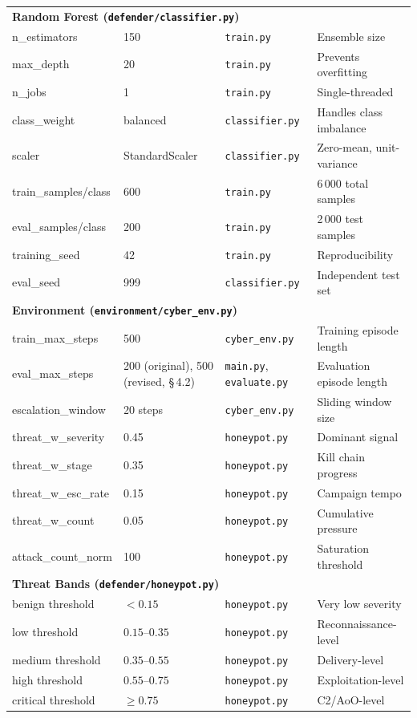 \begin{longtable}{p{3.8cm}p{2.6cm}p{3.5cm}p{3.2cm}}
  \multicolumn{4}{l}{\textbf{Random Forest (\texttt{defender/classifier.py})}} \\[3pt]
  n\_estimators      & 150         & \texttt{train.py}    & Ensemble size \\
  max\_depth         & 20          & \texttt{train.py}    & Prevents overfitting \\
  n\_jobs            & 1           & \texttt{train.py}    & Single-threaded \\
  class\_weight      & balanced    & \texttt{classifier.py} & Handles class imbalance \\
  scaler             & StandardScaler & \texttt{classifier.py} & Zero-mean, unit-variance \\
  train\_samples/class & 600       & \texttt{train.py}    & 6\,000 total samples \\
  eval\_samples/class  & 200       & \texttt{train.py}    & 2\,000 test samples \\
  training\_seed     & 42          & \texttt{train.py}    & Reproducibility \\
  eval\_seed         & 999         & \texttt{classifier.py} & Independent test set \\[6pt]

  \multicolumn{4}{l}{\textbf{Environment (\texttt{environment/cyber\_env.py})}} \\[3pt]
  train\_max\_steps    & 500       & \texttt{cyber\_env.py} & Training episode length \\
  eval\_max\_steps     & 200 (original), 500 (revised, \S\,4.2) & \texttt{main.py}, \texttt{evaluate.py} & Evaluation episode length \\
  escalation\_window   & 20 steps  & \texttt{cyber\_env.py} & Sliding window size \\
  threat\_w\_severity  & 0.45      & \texttt{honeypot.py} & Dominant signal \\
  threat\_w\_stage     & 0.35      & \texttt{honeypot.py} & Kill chain progress \\
  threat\_w\_esc\_rate & 0.15      & \texttt{honeypot.py} & Campaign tempo \\
  threat\_w\_count     & 0.05      & \texttt{honeypot.py} & Cumulative pressure \\
  attack\_count\_norm  & 100       & \texttt{honeypot.py} & Saturation threshold \\[6pt]

  \multicolumn{4}{l}{\textbf{Threat Bands (\texttt{defender/honeypot.py})}} \\[3pt]
  benign threshold   & $< 0.15$    & \texttt{honeypot.py} & Very low severity \\
  low threshold      & $0.15$--$0.35$ & \texttt{honeypot.py} & Reconnaissance-level \\
  medium threshold   & $0.35$--$0.55$ & \texttt{honeypot.py} & Delivery-level \\
  high threshold     & $0.55$--$0.75$ & \texttt{honeypot.py} & Exploitation-level \\
  critical threshold & $\geq 0.75$ & \texttt{honeypot.py} & C2/AoO-level \\[6pt]


\end{longtable}
